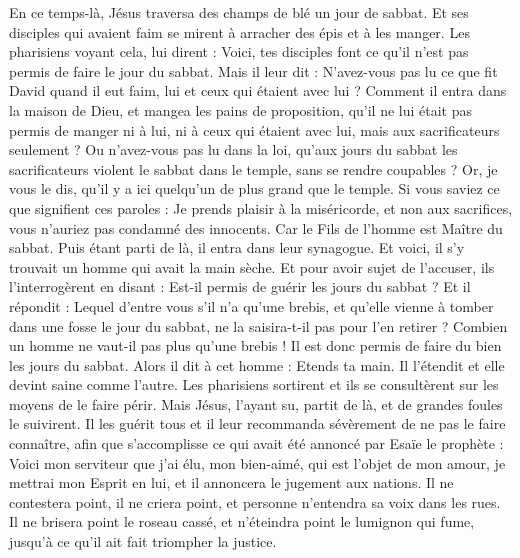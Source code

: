 \begin{multicols}{2}
\VerseOne{}En ce temps-là, Jésus traversa des champs de blé un jour de sabbat. Et ses disciples qui avaient faim se mirent à arracher des épis et à les manger.
Les pharisiens voyant cela, lui dirent : Voici, tes disciples font ce qu'il n'est pas permis de faire le jour du sabbat.
Mais il leur dit : N'avez-vous pas lu ce que fit David quand il eut faim, lui et ceux qui étaient avec lui ?
Comment il entra dans la maison de Dieu, et mangea les pains de proposition, qu’il ne lui était pas permis de manger ni à lui, ni à ceux qui étaient avec lui, mais aux sacrificateurs seulement ?
Ou n'avez-vous pas lu dans la loi, qu'aux jours du sabbat les sacrificateurs violent le sabbat dans le temple, sans se rendre coupables ?
Or, je vous le dis, qu'il y a ici quelqu'un de plus grand que le temple.
Si vous saviez ce que signifient ces paroles : Je prends plaisir à la miséricorde, et non aux sacrifices, vous n'auriez pas condamné des innocents{}.
Car le Fils de l'homme est Maître du sabbat.
Puis étant parti de là, il entra dans leur synagogue.
Et voici, il s’y trouvait un homme qui avait la main sèche. Et pour avoir sujet de l'accuser, ils l'interrogèrent en disant : Est-il permis de guérir les jours du sabbat ?
Et il répondit : Lequel d’entre vous s'il n’a qu’une brebis, et qu'elle vienne à tomber dans une fosse le jour du sabbat, ne la saisira-t-il pas pour l’en retirer ?
Combien un homme ne vaut-il pas plus qu'une brebis ! Il est donc permis de faire du bien les jours du sabbat.
Alors il dit à cet homme : Etends ta main. Il l'étendit et elle devint saine comme l'autre.
Les pharisiens sortirent et ils se consultèrent sur les moyens de le faire périr.
Mais Jésus, l’ayant su, partit de là, et de grandes foules le suivirent. Il les guérit tous
et il leur recommanda sévèrement de ne pas le faire connaître,
afin que s’accomplisse ce qui avait été annoncé par Esaïe le prophète :
Voici mon serviteur que j'ai élu, mon bien-aimé, qui est l'objet de mon amour, je mettrai mon Esprit en lui, et il annoncera le jugement aux nations.
Il ne contestera point, il ne criera point, et personne n'entendra sa voix dans les rues.
Il ne brisera point le roseau cassé, et n'éteindra point le lumignon qui fume, jusqu'à ce qu'il ait fait triompher la justice.

\end{multicols}
